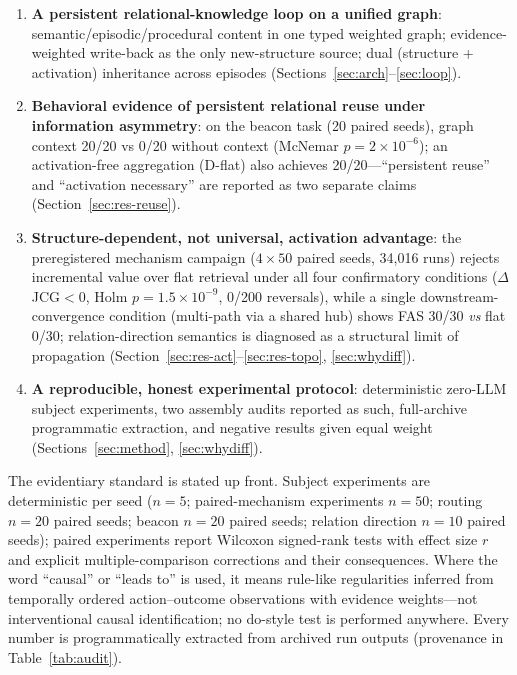 \documentclass[10pt,a4paper]{article}
\begin{document}
\begin{enumerate}
\item \textbf{A persistent relational-knowledge loop on a unified graph}: semantic/episodic/procedural content in one typed weighted graph; evidence-weighted write-back as the only new-structure source; dual (structure + activation) inheritance across episodes (Sections~\ref{sec:arch}--\ref{sec:loop}).
\item \textbf{Behavioral evidence of persistent relational reuse under information asymmetry}: on the beacon task (20 paired seeds), graph context 20/20 vs 0/20 without context (McNemar $p{=}2\times10^{-6}$); an activation-free aggregation (D-flat) also achieves 20/20---``persistent reuse'' and ``activation necessary'' are reported as two separate claims (Section~\ref{sec:res-reuse}).
\item \textbf{Structure-dependent, not universal, activation advantage}: the preregistered mechanism campaign ($4\times50$ paired seeds, 34{,}016 runs) rejects incremental value over flat retrieval under all four confirmatory conditions ($\Delta$JCG${<}0$, Holm $p{=}1.5\times10^{-9}$, 0/200 reversals), while a single downstream-convergence condition (multi-path via a shared hub) shows FAS 30/30 \emph{vs} flat 0/30; relation-direction semantics is diagnosed as a structural limit of propagation (Section~\ref{sec:res-act}--\ref{sec:res-topo}, \ref{sec:whydiff}).
\item \textbf{A reproducible, honest experimental protocol}: deterministic zero-LLM subject experiments, two assembly audits reported as such, full-archive programmatic extraction, and negative results given equal weight (Sections~\ref{sec:method}, \ref{sec:whydiff}).
\end{enumerate}

The evidentiary standard is stated up front. Subject experiments are deterministic per seed ($n{=}5$; paired-mechanism experiments $n{=}50$; routing $n{=}20$ paired seeds; beacon $n{=}20$ paired seeds; relation direction $n{=}10$ paired seeds); paired experiments report Wilcoxon signed-rank tests with effect size $r$ and explicit multiple-comparison corrections and their consequences. Where the word ``causal'' or ``leads to'' is used, it means rule-like regularities inferred from temporally ordered action--outcome observations with evidence weights---not interventional causal identification; no do-style test is performed anywhere. Every number is programmatically extracted from archived run outputs (provenance in Table~\ref{tab:audit}).
\end{document}
